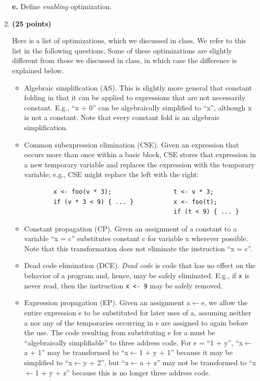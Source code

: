 \documentclass[11pt]{article} %
\begin{document}
\begin{enumerate}
{\bf{e.}} Define {\em enabling} optimization.


\newpage
\item  {\bf (25 points)}

Here is a list of optimizations, which we discussed in class. We refer to this list in the following questions. Some of these optimizations are slightly different from those we discussed in class, in which case the difference is explained below.
\begin{itemize}
\item Algebraic simplification (AS). This is slightly more general that constant folding in that it can be applied to expressions that are not necessarily constant. E.g., “x + 0” can be algebraically simplified to “x”, although x is not a constant. Note that every constant fold is an algebraic simplification.

\item Common subexpression elimination (CSE). 
Given an expression that occurs more than once within a basic block, CSE stores that expression in a new temporary variable and replaces the expression with the temporary variable; e.g., CSE might replace the left with the right:
\begin{verbatim}
        x <- foo(v * 3);                 t <- v * 3; 
        if (v * 3 < 9) { ... }           x <- foo(t);
                                         if (t < 9) { ... }
\end{verbatim}


\item Constant propagation (CP). Given an assignment of a constant to a variable “x = c” substitutes constant c for variable x wherever possible. Note that this transformation does not eliminate the instruction “x = c”.

\item Dead code elimination (DCE). \emph{Dead code} is code that has no effect on the behavior of a program and, hence, may be safely eliminated. E.g., if \verb+x+ is never read, then the instruction \verb+x <- 9+ may be safely removed.

\item Expression propagation (EP). Given an assignment a$\leftarrow$e, we allow the entire expression e to be substituted for later uses of a, assuming neither a nor any of the temporaries occurring in e are assigned to again before the use. The code resulting from substituting e for a must be “algebraically simplifiable” to three address code. For e = “1 + y”, 
“x$\leftarrow$a + 1” may be transformed to “x$\leftarrow$1 + y + 1” because it may be simplified to “x$\leftarrow$y + 2”, but
“x$\leftarrow$a + z” may not be transformed to “x$\leftarrow$1 + y + z” because this is no longer three address code.
\end{itemize}


\end{enumerate}
\end{document}
